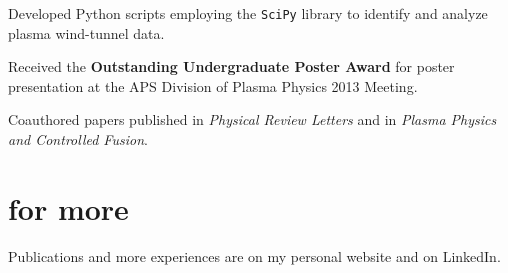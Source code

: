 \documentclass[]{friggeri-cv}
\begin{document}
\begin{entrylist}
{\begin{my-itemize}
      \item Developed Python scripts employing the \texttt{SciPy} library to identify and analyze plasma wind-tunnel data.

      \item Received the \textbf{Outstanding Undergraduate Poster Award} for poster presentation at the APS Division of Plasma Physics 2013 Meeting.

      \item Coauthored papers published in \textit{Physical Review Letters} and in \textit{Plasma Physics and Controlled Fusion}.
      \end{my-itemize}
    }
%
\end{entrylist}

\section{for more}
Publications and more experiences are on my personal website and on LinkedIn.

\end{document}

